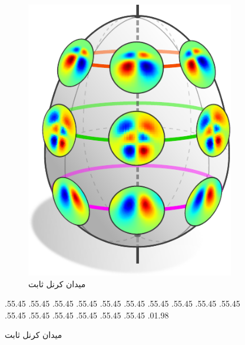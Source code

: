 \begin{figure}
\begin{subfigure}[b]{0.24\textwidth}
		\includegraphics[width=.92\textwidth]{figures/isometry_egg_intro_antisymmetric.pdf}
		\vspace*{-.5ex}
		\captionsetup{format=hang, width=.7\textwidth}
		\caption{\small
			میدان کرنل ثابت 
		}
		\label{fig:isom_invariant_kernel_field_intro_O2}
	\end{subfigure}
	\par
	\vspace*{\dimexpr-\parskip-158.pt\relax}%
	.55\textwidth .45\textwidth %
	.55\textwidth .45\textwidth
	.55\textwidth .45\textwidth
	.55\textwidth .45\textwidth
	.55\textwidth .45\textwidth
	.55\textwidth .45\textwidth
	.55\textwidth .45\textwidth
	.55\textwidth .45\textwidth
	.55\textwidth .45\textwidth
	.55\textwidth .45\textwidth
	.55\textwidth .45\textwidth
	.55\textwidth .45\textwidth
	.55\textwidth .45\textwidth
	.55\textwidth .45\textwidth
	.55\textwidth .45\textwidth
	.55\textwidth .45\textwidth
	.01\textwidth .98\textwidth %

\end{figure}
